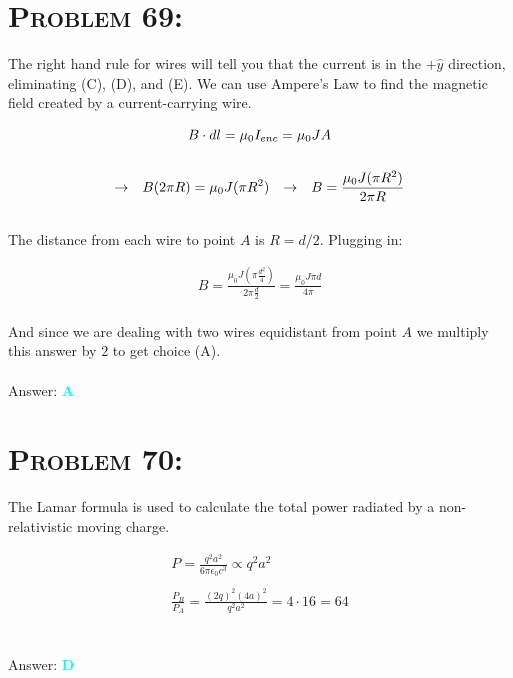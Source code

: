 \documentclass{article}
\begin{document}

\section{\textsc{Problem 69:}} The right hand rule for wires will tell you that the current is in the $+\hat{y}$ direction, eliminating (C), (D), and (E). We can use Ampere's Law to find the magnetic field created by a current-carrying wire.

\begin{gather}
\label{eq: ampslaw} B \cdot dl = \mu_{0} I_{enc} = \mu_{0} J A\\
\nonumber\\
\rightarrow \hspace{.1in} B (2 \pi R) = \mu_{0} J (\pi R^{2})  \hspace{.1in}  \rightarrow \hspace{.1in} B  = \frac{\mu_{0} J (\pi R^{2})}{2 \pi R}\nonumber
\end{gather}
\\
The distance from each wire to point $A$ is $R = d/2$. Plugging in:

\begin{gather}
B  = \frac{\mu_{0} J (\pi \frac{d^{2}}{4})}{2 \pi \frac{d}{2}} = \frac{\mu_{0} J \pi d}{4 \pi} \nonumber
\end{gather}
\\
And since we are dealing with two wires equidistant from point $A$ we multiply this answer by $2$ to get choice (A).
\\\\
Answer: \textbf{\textcolor{cyan}A}\\


\section{\textsc{Problem 70:}} The Lamar formula is used to calculate the total power radiated by a non-relativistic moving charge.

\begin{gather}
P = \frac{ q^{2}  a^{2}  } {  6 \pi \epsilon_{0} c^{3} } \propto q^{2} a^{2}\\
\nonumber\\
\frac{P_{B}}{P_{A}} = \frac{(2 q)^{2} (4a)^{2}}{q^{2} a^{2}} = 4 \cdot 16 = \boxed{64}
\end{gather}
\\\\
Answer: \textbf{\textcolor{cyan}D}\\
\end{document}
